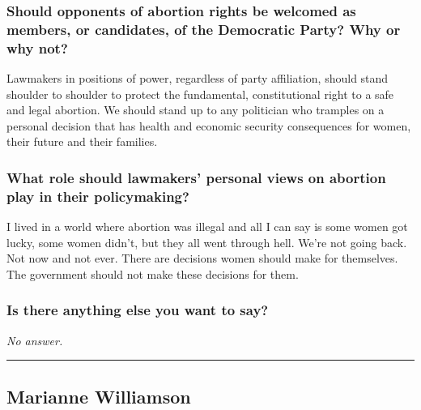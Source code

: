 \hypertarget{should-opponents-of-abortion-rights-be-welcomed-as-members-or-candidates-of-the-democratic-party-why-or-why-not-7}{%
\subsubsection{Should opponents of abortion rights be welcomed as
members, or candidates, of the Democratic Party? Why or why
not?}\label{should-opponents-of-abortion-rights-be-welcomed-as-members-or-candidates-of-the-democratic-party-why-or-why-not-7}}

Lawmakers in positions of power, regardless of party affiliation, should
stand shoulder to shoulder to protect the fundamental, constitutional
right to a safe and legal abortion. We should stand up to any politician
who tramples on a personal decision that has health and economic
security consequences for women, their future and their families.

\hypertarget{what-role-should-lawmakers-personal-views-on-abortion-play-in-their-policymaking-7}{%
\subsubsection{What role should lawmakers' personal views on abortion
play in their
policymaking?}\label{what-role-should-lawmakers-personal-views-on-abortion-play-in-their-policymaking-7}}

I lived in a world where abortion was illegal and all I can say is some
women got lucky, some women didn't, but they all went through hell.
We're not going back. Not now and not ever. There are decisions women
should make for themselves. The government should not make these
decisions for them.

\hypertarget{is-there-anything-else-you-want-to-say-7}{%
\subsubsection{Is there anything else you want to
say?}\label{is-there-anything-else-you-want-to-say-7}}

\emph{No answer.}

\begin{center}\rule{0.5\linewidth}{\linethickness}\end{center}

\hypertarget{marianne-williamson}{%
\subsection{Marianne Williamson}\label{marianne-williamson}}


